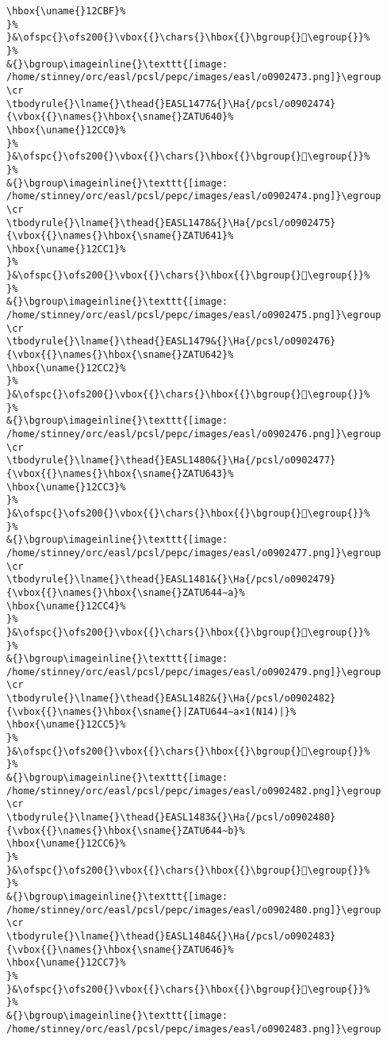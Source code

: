 \begin{verbatim}
\hbox{\uname{}12CBF}%
}%
}&\ofspc{}\ofs200{}\vbox{{}\chars{}\hbox{{}\bgroup{}𒲿\egroup{}}%
}%
&{}\bgroup\imageinline{}\texttt{[image: /home/stinney/orc/easl/pcsl/pepc/images/easl/o0902473.png]}\egroup
\cr
\tbodyrule{}\lname{}\thead{}EASL1477&{}\Ha{/pcsl/o0902474}{\vbox{{}\names{}\hbox{\sname{}ZATU640}%
\hbox{\uname{}12CC0}%
}%
}&\ofspc{}\ofs200{}\vbox{{}\chars{}\hbox{{}\bgroup{}𒳀\egroup{}}%
}%
&{}\bgroup\imageinline{}\texttt{[image: /home/stinney/orc/easl/pcsl/pepc/images/easl/o0902474.png]}\egroup
\cr
\tbodyrule{}\lname{}\thead{}EASL1478&{}\Ha{/pcsl/o0902475}{\vbox{{}\names{}\hbox{\sname{}ZATU641}%
\hbox{\uname{}12CC1}%
}%
}&\ofspc{}\ofs200{}\vbox{{}\chars{}\hbox{{}\bgroup{}𒳁\egroup{}}%
}%
&{}\bgroup\imageinline{}\texttt{[image: /home/stinney/orc/easl/pcsl/pepc/images/easl/o0902475.png]}\egroup
\cr
\tbodyrule{}\lname{}\thead{}EASL1479&{}\Ha{/pcsl/o0902476}{\vbox{{}\names{}\hbox{\sname{}ZATU642}%
\hbox{\uname{}12CC2}%
}%
}&\ofspc{}\ofs200{}\vbox{{}\chars{}\hbox{{}\bgroup{}𒳂\egroup{}}%
}%
&{}\bgroup\imageinline{}\texttt{[image: /home/stinney/orc/easl/pcsl/pepc/images/easl/o0902476.png]}\egroup
\cr
\tbodyrule{}\lname{}\thead{}EASL1480&{}\Ha{/pcsl/o0902477}{\vbox{{}\names{}\hbox{\sname{}ZATU643}%
\hbox{\uname{}12CC3}%
}%
}&\ofspc{}\ofs200{}\vbox{{}\chars{}\hbox{{}\bgroup{}𒳃\egroup{}}%
}%
&{}\bgroup\imageinline{}\texttt{[image: /home/stinney/orc/easl/pcsl/pepc/images/easl/o0902477.png]}\egroup
\cr
\tbodyrule{}\lname{}\thead{}EASL1481&{}\Ha{/pcsl/o0902479}{\vbox{{}\names{}\hbox{\sname{}ZATU644∼a}%
\hbox{\uname{}12CC4}%
}%
}&\ofspc{}\ofs200{}\vbox{{}\chars{}\hbox{{}\bgroup{}𒳄\egroup{}}%
}%
&{}\bgroup\imageinline{}\texttt{[image: /home/stinney/orc/easl/pcsl/pepc/images/easl/o0902479.png]}\egroup
\cr
\tbodyrule{}\lname{}\thead{}EASL1482&{}\Ha{/pcsl/o0902482}{\vbox{{}\names{}\hbox{\sname{}|ZATU644∼a×1(N14)|}%
\hbox{\uname{}12CC5}%
}%
}&\ofspc{}\ofs200{}\vbox{{}\chars{}\hbox{{}\bgroup{}𒳅\egroup{}}%
}%
&{}\bgroup\imageinline{}\texttt{[image: /home/stinney/orc/easl/pcsl/pepc/images/easl/o0902482.png]}\egroup
\cr
\tbodyrule{}\lname{}\thead{}EASL1483&{}\Ha{/pcsl/o0902480}{\vbox{{}\names{}\hbox{\sname{}ZATU644∼b}%
\hbox{\uname{}12CC6}%
}%
}&\ofspc{}\ofs200{}\vbox{{}\chars{}\hbox{{}\bgroup{}𒳆\egroup{}}%
}%
&{}\bgroup\imageinline{}\texttt{[image: /home/stinney/orc/easl/pcsl/pepc/images/easl/o0902480.png]}\egroup
\cr
\tbodyrule{}\lname{}\thead{}EASL1484&{}\Ha{/pcsl/o0902483}{\vbox{{}\names{}\hbox{\sname{}ZATU646}%
\hbox{\uname{}12CC7}%
}%
}&\ofspc{}\ofs200{}\vbox{{}\chars{}\hbox{{}\bgroup{}𒳇\egroup{}}%
}%
&{}\bgroup\imageinline{}\texttt{[image: /home/stinney/orc/easl/pcsl/pepc/images/easl/o0902483.png]}\egroup

\end{verbatim}
